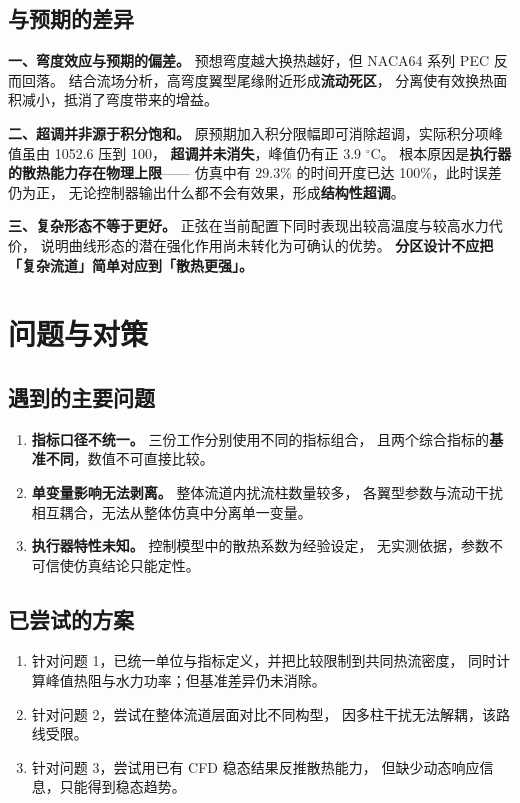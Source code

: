 \documentclass[stage2,fontset=fandol]{ydzjreport}
\begin{document}
\subsection{与预期的差异}

\textbf{一、弯度效应与预期的偏差。}
预想弯度越大换热越好，但 NACA64 系列 PEC 反而回落。
结合流场分析，高弯度翼型尾缘附近形成\textbf{流动死区}，
分离使有效换热面积减小，抵消了弯度带来的增益。

\textbf{二、超调并非源于积分饱和。}
原预期加入积分限幅即可消除超调，实际积分项峰值虽由 1052.6 压到 100，
\textbf{超调并未消失}，峰值仍有正 3.9 $^\circ$C。
根本原因是\textbf{执行器的散热能力存在物理上限}——
仿真中有 29.3\% 的时间开度已达 100\%，此时误差仍为正，
无论控制器输出什么都不会有效果，形成\textbf{结构性超调}。

\textbf{三、复杂形态不等于更好。}
正弦在当前配置下同时表现出较高温度与较高水力代价，
说明曲线形态的潜在强化作用尚未转化为可确认的优势。
\textbf{分区设计不应把「复杂流道」简单对应到「散热更强」。}

\section{问题与对策}

\subsection{遇到的主要问题}

\begin{enumerate}
  \item \textbf{指标口径不统一。} 三份工作分别使用不同的指标组合，
        且两个综合指标的\textbf{基准不同}，数值不可直接比较。
  \item \textbf{单变量影响无法剥离。} 整体流道内扰流柱数量较多，
        各翼型参数与流动干扰相互耦合，无法从整体仿真中分离单一变量。
  \item \textbf{执行器特性未知。} 控制模型中的散热系数为经验设定，
        无实测依据，参数不可信使仿真结论只能定性。
\end{enumerate}

\subsection{已尝试的方案}

\begin{enumerate}
  \item 针对问题 1，已统一单位与指标定义，并把比较限制到共同热流密度，
        同时计算峰值热阻与水力功率；但基准差异仍未消除。
  \item 针对问题 2，尝试在整体流道层面对比不同构型，
        因多柱干扰无法解耦，该路线受限。
  \item 针对问题 3，尝试用已有 CFD 稳态结果反推散热能力，
        但缺少动态响应信息，只能得到稳态趋势。
\end{enumerate}
\end{document}
